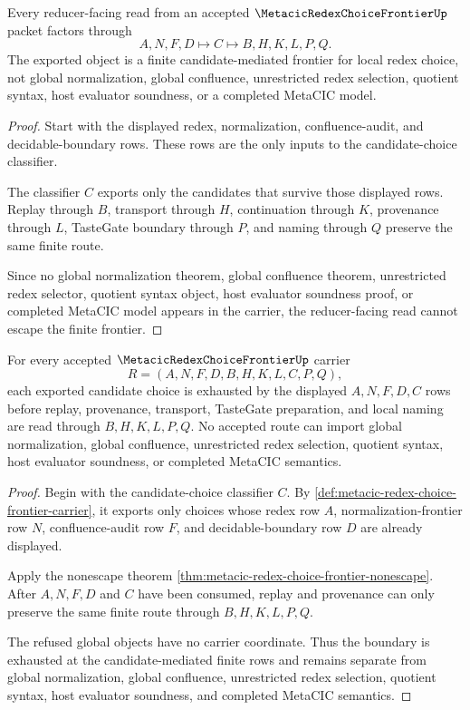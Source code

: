 \begin{theorem}
\label{thm:metacic-redex-choice-frontier-nonescape}
Every reducer-facing read from an accepted $\MetacicRedexChoiceFrontierUp$ packet factors through
$$
A,N,F,D \longmapsto C \longmapsto B,H,K,L,P,Q .
$$
The exported object is a finite candidate-mediated frontier for local redex choice, not global normalization, global confluence, unrestricted redex selection, quotient syntax, host evaluator soundness, or a completed MetaCIC model.
\end{theorem}
\begin{proof}
Start with the displayed redex, normalization, confluence-audit, and decidable-boundary rows. These rows are the only inputs to the candidate-choice classifier.

The classifier $C$ exports only the candidates that survive those displayed rows. Replay through $B$, transport through $H$, continuation through $K$, provenance through $L$, TasteGate boundary through $P$, and naming through $Q$ preserve the same finite route.

Since no global normalization theorem, global confluence theorem, unrestricted redex selector, quotient syntax object, host evaluator soundness proof, or completed MetaCIC model appears in the carrier, the reducer-facing read cannot escape the finite frontier.
\end{proof}

\begin{theorem}
\label{thm:metacic-redex-choice-frontier-candidate-boundary-exhaustion}
For every accepted $\MetacicRedexChoiceFrontierUp$ carrier
$$
R=(A,N,F,D,B,H,K,L,C,P,Q),
$$
each exported candidate choice is exhausted by the displayed $A,N,F,D,C$ rows before replay, provenance, transport, TasteGate preparation, and local naming are read through $B,H,K,L,P,Q$. No accepted route can import global normalization, global confluence, unrestricted redex selection, quotient syntax, host evaluator soundness, or completed MetaCIC semantics.
\end{theorem}
\begin{proof}
Begin with the candidate-choice classifier $C$. By \autoref{def:metacic-redex-choice-frontier-carrier}, it exports only choices whose redex row $A$, normalization-frontier row $N$, confluence-audit row $F$, and decidable-boundary row $D$ are already displayed.

Apply the nonescape theorem \autoref{thm:metacic-redex-choice-frontier-nonescape}. After $A,N,F,D$ and $C$ have been consumed, replay and provenance can only preserve the same finite route through $B,H,K,L,P,Q$.

The refused global objects have no carrier coordinate. Thus the boundary is exhausted at the candidate-mediated finite rows and remains separate from global normalization, global confluence, unrestricted redex selection, quotient syntax, host evaluator soundness, and completed MetaCIC semantics.
\end{proof}

